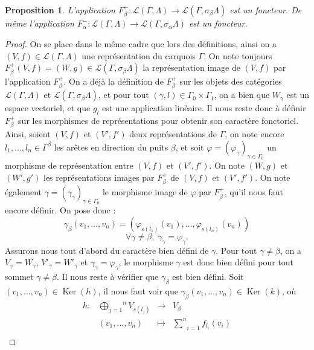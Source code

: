 \documentclass[a4paper,10pt]{article}
\newtheorem{prop}[]{Proposition}[section]
\DeclareMathOperator{\Ker}{Ker}
\begin{document}
\begin{prop}
	L'application $F_{\beta}^{+}:\mathscr{L}(\Gamma,\Lambda)\rightarrow\mathscr{L}(\Gamma,\sigma_{\beta}\Lambda)$ est un foncteur. De même l'application $F_{\alpha}^{-}:\mathscr{L}(\Gamma,\Lambda)\rightarrow\mathscr{L}(\Gamma,\sigma_{\alpha}\Lambda)$ est un foncteur.
\end{prop}

\begin{proof}
	On se place dans le même cadre que lors des définitions, ainsi on a $(V,f)\in\mathscr{L}(\Gamma,\Lambda)$ une représentation du carquois $\Gamma$. On note toujours $F_{\beta}^{+}(V,f)=(W,g)\in\mathscr{L}(\Gamma,\sigma_{\beta}\Lambda)$ la représentation image de $(V,f)$ par l'application $F_{\beta}^{+}$. On a déjà la définition de $F_{\beta}^{+}$ sur les objets des catégories $\mathscr{L}(\Gamma,\Lambda)$ et $\mathscr{L}(\Gamma,\sigma_{\beta}\Lambda)$, et pour tout $(\gamma,l)\in\Gamma_{0}\times\Gamma_{1}$, on a bien que $W_{\gamma}$ est un espace vectoriel, et que $g_{l}$ est une application linéaire. Il nous reste donc à définir $F_{\beta}^{+}$ sur les morphismes de représentations pour obtenir son caractère fonctoriel. Ainsi, soient $(V,f)$ et $(V',f')$ deux représentations de $\Gamma$, on note encore $l_{1},\dots,l_{n}\in\Gamma^{\beta}$ les arêtes en direction du puits $\beta$, et soit $\varphi=(\varphi_{\gamma})_{\gamma\in\Gamma_{0}}$ un morphisme de représentation entre $(V,f)$ et $(V',f')$. On note $(W,g)$ et $(W',g')$ les représentations images par $F_{\beta}^{+}$ de $(V,f)$ et $(V',f')$. On note également $\gamma=(\gamma_{\gamma})_{\gamma\in\Gamma_{0}}$ le morphisme image de $\varphi$ par $F_{\beta}^{+}$, qu'il nous faut encore définir. On pose donc :
	\[	
		\gamma_{\beta}(v_{1},\dots,v_{n})=(\varphi_{s(l_{1})}(v_{1}),\dots,\varphi_{s(l_{n})}(v_{n}))
	\]
	\[
		\forall \gamma\neq\beta,\; \gamma_{\gamma}=\varphi_{\gamma}.
	\]
	Assurons nous tout d'abord du caractère bien défini de $\gamma$. Pour tout $\gamma\neq\beta$, on a $V_{\gamma}=W_{\gamma}$, $V'_{\gamma}=W'_{\gamma}$ et $\gamma_{\gamma}=\varphi_{\gamma}$, le morphisme $\gamma$ est donc bien défini pour tout sommet $\gamma\neq\beta$. Il nous reste à vérifier que $\gamma_{\beta}$ est bien défini. Soit $(v_{1},\dots,v_{n})\in\Ker(h)$, il nous faut voir que $\gamma_{\beta}(v_{1},\dots,v_{n})\in\Ker(k)$, où
	\[
\begin{array}{lccc}
	h : & \overset{n}{\underset{j=1}{\bigoplus}}V_{s(l_{j})}&\rightarrow & V_{\beta} \\ 
	& (v_{1},\dots,v_{n})&\mapsto & \underset{i=1}{\overset{n}{\sum}}f_{l_{i}}(v_{i})\\

\end{array}\]
\end{proof}
\end{document}
